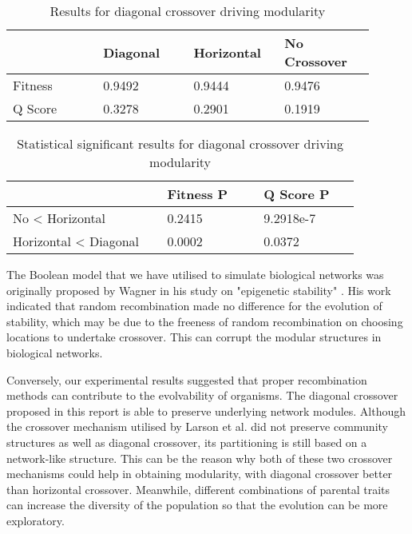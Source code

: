 \begin{table}[h]
	\centering
	\caption{Results for diagonal crossover driving modularity}
	\label{table:4.4}
	\begin{tabular}{| p{0.225\linewidth}  | p{0.225\linewidth}  | p{0.225\linewidth}  | p{0.225\linewidth}  |} 
		\hline
		  & Diagonal & Horizontal & No Crossover \\
		\hline
		Fitness & 0.9492 & 0.9444 & 0.9476 \\ 
		\hline
		Q Score & 0.3278 & 0.2901 & 0.1919 \\
		\hline
	\end{tabular}
\end{table}

\begin{table}[h]
	\centering
	\caption{Statistical significant results for diagonal crossover driving modularity}
	\label{table:4.5}
	\begin{tabular}{| p{0.4\linewidth}  | p{0.25\linewidth}  | p{0.25\linewidth}  |} 
		\hline
		& Fitness P & Q Score P \\
		\hline
		No < Horizontal & 0.2415 & 9.2918e-7 \\ 
		\hline
		Horizontal < Diagonal & 0.0002 & 0.0372 \\
		\hline
	\end{tabular}
\end{table}

The Boolean model that we have utilised to simulate biological networks was originally proposed by Wagner in his study on "epigenetic stability" \cite{wagner1996does}. His work indicated that random recombination made no difference for the evolution of stability, which may be due to the freeness of random recombination on choosing locations to undertake crossover. This can corrupt the modular structures in biological networks.

Conversely, our experimental results suggested that proper recombination methods can contribute to the evolvability of organisms. The diagonal crossover proposed in this report is able to preserve underlying network modules. Although the crossover mechanism utilised by Larson et al. did not preserve community structures as well as diagonal crossover, its partitioning is still based on a network-like structure. This can be the reason why both of these two crossover mechanisms could help in obtaining modularity, with diagonal crossover better than horizontal crossover. Meanwhile, different combinations of parental traits can increase the diversity of the population so that the evolution can be more exploratory.

